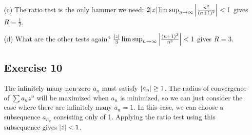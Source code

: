 (c) The ratio test is the only hammer we need: $2 \abs{z} \limsup_{n \to \infty} \abs{\frac{n^2}{(n+1)^2}} < 1$ 
gives $R = \frac{1}{2}$.

(d) What are the other tests again? $\frac{\abs{z}}{3} \limsup_{n \to \infty} \abs{\frac{(n + 1)^3}{n^3}} < 1$ 
gives $R = 3$.

\subsection{Exercise 10}
The infinitely many non-zero $a_n$ must satisfy $\abs{a_n} \geq 1$. The radius of convergence of $\sum a_n z^n$ 
will be maximized when $a_n$ is minimized, so we can just consider the case where there are infinitely many
$a_n = 1$. In this case, we can choose a subsequence $a_{n_k}$ consisting only of 1. Applying the ratio
test using this subsequence gives  $\abs{z} < 1$.
